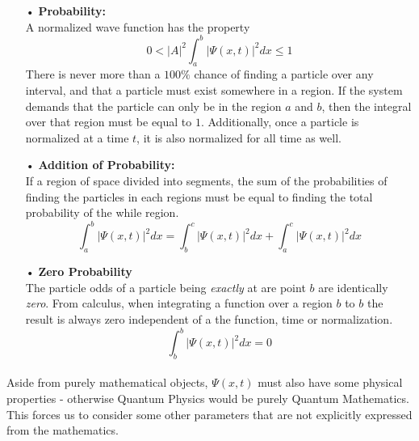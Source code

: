 \documentclass[12pt,letterpaper]{book}
\begin{document}
\begin{enumerate}
\item[•]\textbf{Probability:}\\
A normalized wave function has the property
\begin{equation}
0 < |A|^2 \int_{a}^{b} \big | \Psi(x,t) \big|^2 dx \leq 1
\end{equation}
There is never more than a $100\%$ chance of finding a particle over any interval, and that a particle must exist somewhere in a region. If the system demands that the particle can only be in the region $a$ and $b$, then the integral over that region must be equal to $1$. Additionally, once a particle is normalized at a time $t$, it is also normalized for all time as well.
\item[•]\textbf{Addition of Probability:}\\
If a region of space divided into segments, the sum of the probabilities of finding the particles in each regions must be equal to finding the total probability of the while region.
\begin{equation}
\int_{a}^{b} \big | \Psi(x,t) \big|^2 dx =
\int_{b}^{c} \big | \Psi(x,t) \big|^2 dx +
\int_{a}^{c} \big | \Psi(x,t) \big|^2 dx
\end{equation}
\item[•]\textbf{Zero Probability}\\
The particle odds of a particle being \textit{exactly} at are point $b$ are identically \textit{zero}. From calculus, when integrating a function over a region $b$ to $b$ the result is always zero independent of a the function, time or normalization. 
\begin{equation}
\int_{b}^{b} \big | \Psi(x,t) \big|^2 dx = 0
\end{equation}
\end{enumerate}
\paragraph*{}Aside from purely mathematical objects, $\Psi(x,t)$ must also have some physical properties - otherwise Quantum Physics would be purely Quantum Mathematics. This forces us to consider some other parameters that are not explicitly expressed from the mathematics.
\end{document}
